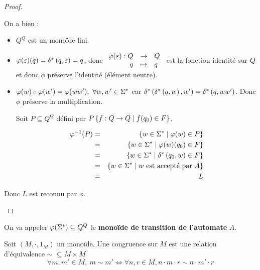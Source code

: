 \begin{proof}
\begin{itemize}
		      On a bien :
		      \begin{itemize}
			      \item $Q^Q$ est un monoïde fini.
			      \item $\varphi (\varepsilon) (q) = \delta^{*} \left(q,\varepsilon\right) = q$, donc $\begin{array}{rcl}
					            \varphi (\varepsilon) : Q & \to     & Q \\
					            q                   & \mapsto & q
				            \end{array} $
			            est la fonction identité sur $Q$ et donc $\phi$ préserve l'identité (élément neutre).
			      \item $\varphi (w) \circ \varphi (w') = \varphi (ww'), \ \forall w, w' \in \Sigma^{*}$ car
			            $\delta^{*} \left(\delta^{*} \left(q,w\right),w'\right) = \delta^{*} \left(q,ww'\right)$.
						Donc $\phi$ préserve la multiplication.


			            Soit $P \subseteq Q^Q$ défini par $P \left\{f : Q \to Q \mid f(q_0)\in F\right\}$.

			            \begin{eqnarray*}
				            \varphi^{-1} (P) &=& \left\{w \in \Sigma^{*} \mid \varphi (w) \in P\right\} \\
				            &=& \left\{w \in \Sigma^{*} \mid \varphi (w) (q_0)\in F\right\} \\
				            &=& \left\{w \in \Sigma^{*} \mid \delta^{*} \left(q_0,w\right) \in F\right\}\\
				            &=& \left\{w \in \Sigma^{*} \mid w \text { est accepté par } A\right\}\\
				            &=& L
			            \end{eqnarray*}
		      \end{itemize}

		      Donc $L$ est reconnu par $\phi$.
	\end{itemize}
\end{proof}

\begin{definition}
	On va appeler $\varphi (\Sigma^{*})\subseteq Q^Q$ le \textbf{monoïde de transition de l'automate} $A$.
\end{definition}


\begin{definition}[Congruence]
	Soit $(M, \cdot, 1_M)$ un monoïde. Une congruence sur $M$ est une relation d'équivalence $\sim$ $\subseteq M \times M$ \tlq
	$$\forall m,m'\in M, \ m \sim m' \iff \forall n,r \in M, n\cdot m \cdot r \sim n \cdot m' \cdot r$$
\end{definition}

